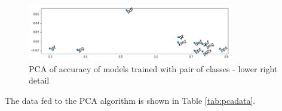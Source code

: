 \noindent
\begin{figure}[htb!]
\centering\includegraphics[width=0.8\textwidth]{content/pca2.png}
\caption[PCA of accuracy of models trained with pair of classes - detail]{\label{fig:pca2}PCA of accuracy of models trained with pair of classes - lower right detail}%
\end{figure}

The data fed to the PCA algorithm is shown in Table \ref{tab:pcadata}.


